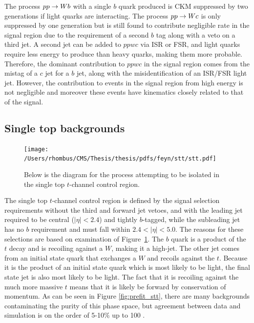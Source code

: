 The process $pp\rightarrow Wb$ with a single $b$ quark
 produced is CKM suppressed by two generations
 if light quarks are interacting.
The process $pp\rightarrow Wc$ is only suppressed by one
 generation but is still found to contribute
 negligible rate in the signal region due to
 the requirement of a second $b$ tag along
 with a veto on a third jet.
A second jet can be added to $ppwc$ via ISR or FSR,
 and light quarks require less energy to produce
 than heavy quarks, making them more probable.
Therefore, the dominant contribution to 
 $ppwc$ in the signal region comes from the 
 mistag of a $c$ jet for a $b$ jet, along with 
 the misidentification of an ISR/FSR light jet.
However, the contribution to events in the signal region
 from high energy \gcc is not negligible and
 moreover these events have kinematics closely related 
 to that of the signal. 

\subsection{Single top backgrounds}
\label{section:topbackgrounds}

\begin{figure}
\caption[Diagram for single top $t$-channel control region]
{
Below is the diagram for the process attempting
 to be isolated in the single top $t$-channel 
 control region.
}
\center
 \texttt{[image: /Users/rhombus/CMS/Thesis/thesis/pdfs/feyn/stt/stt.pdf]}
\label{fig:feynstt}
\end{figure}

The single top $t$-channel control region is defined by the signal selection requirements
 without the third and forward jet vetoes, and
 with the leading jet required to be central
 ($|\eta|<2.4$) and tightly $b$-tagged,
 while the subleading jet has no $b$ requirement and must fall within
 $2.4<|\eta|<5.0$.
The reasons for these selections are based on examination
 of Figure~\ref{fig:feynstt}.
The $b$ quark is a product of the $t$ decay and is recoiling
 against a $W$, making it a high-\pt jet.
The other jet comes from an initial state
 quark that exchanges a $W$ and recoils against the  $t$.
Because it is the product of an initial state quark which
 is most likely to be light,
 the final state jet is also most likely to be light.
The fact that it is recoiling against the much more massive $t$
 means that it is likely be forward by conservation of momentum.
As can be seen in Figure \ref{fig:prefit_stt}, there are many 
 backgrounds contaminating the purity of this phase space,
 but agreement between data and simulation is on the order of 5-10\%
 up to 100 \GeV.

